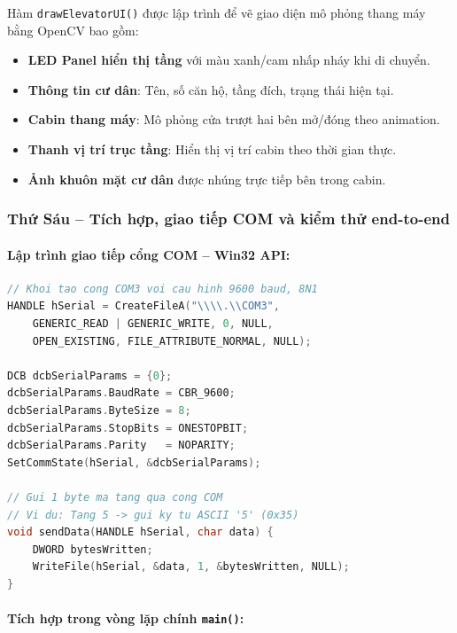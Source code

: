 \documentclass[12pt,a4paper]{article}
\begin{document}
Hàm \texttt{drawElevatorUI()} được lập trình để vẽ giao diện mô phỏng thang máy bằng OpenCV bao gồm:
\begin{itemize}[leftmargin=1.5cm]
    \item \textbf{LED Panel hiển thị tầng} với màu xanh/cam nhấp nháy khi di chuyển.
    \item \textbf{Thông tin cư dân}: Tên, số căn hộ, tầng đích, trạng thái hiện tại.
    \item \textbf{Cabin thang máy}: Mô phỏng cửa trượt hai bên mở/đóng theo animation.
    \item \textbf{Thanh vị trí trục tầng}: Hiển thị vị trí cabin theo thời gian thực.
    \item \textbf{Ảnh khuôn mặt cư dân} được nhúng trực tiếp bên trong cabin.
\end{itemize}

\subsubsection{Thứ Sáu -- Tích hợp, giao tiếp COM và kiểm thử end-to-end}

\paragraph{Lập trình giao tiếp cổng COM -- Win32 API:}
\begin{lstlisting}[language=C++, caption={Khởi tạo cổng COM3 và hàm gửi lệnh tầng}]
// Khoi tao cong COM3 voi cau hinh 9600 baud, 8N1
HANDLE hSerial = CreateFileA("\\\\.\\COM3",
    GENERIC_READ | GENERIC_WRITE, 0, NULL,
    OPEN_EXISTING, FILE_ATTRIBUTE_NORMAL, NULL);

DCB dcbSerialParams = {0};
dcbSerialParams.BaudRate = CBR_9600;
dcbSerialParams.ByteSize = 8;
dcbSerialParams.StopBits = ONESTOPBIT;
dcbSerialParams.Parity   = NOPARITY;
SetCommState(hSerial, &dcbSerialParams);

// Gui 1 byte ma tang qua cong COM
// Vi du: Tang 5 -> gui ky tu ASCII '5' (0x35)
void sendData(HANDLE hSerial, char data) {
    DWORD bytesWritten;
    WriteFile(hSerial, &data, 1, &bytesWritten, NULL);
}
\end{lstlisting}

\paragraph{Tích hợp trong vòng lặp chính \texttt{main()}:}
\end{document}
